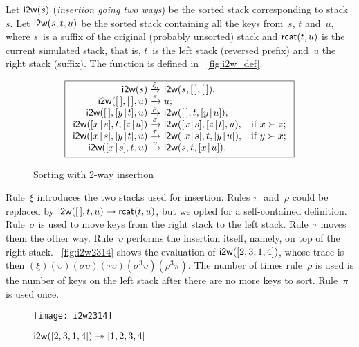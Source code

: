 Let \(\textsf{i2w}(s)\) (\emph{insertion going two
  ways}) be the sorted stack corresponding to stack~\(s\). Let
\(\textsf{i2w}(s,t,u)\) be the sorted stack
containing all the keys from~\(s\), \(t\) and~\(u\), where \(s\)~is a
suffix of the original (probably unsorted) stack and
\(\textsf{rcat}(t,u)\) is the current simulated
stack, that is, \(t\)~is the left stack (reversed prefix) and~\(u\)
the right stack (suffix). The function
 is defined in
\fig~\vref{fig:i2w_def}.
\begin{figure}
\begin{equation*}
\boxed{%
\begin{array}{r@{\;}l@{\;}ll}
\fun{i2w}(s)         & \xrightarrow{\smash{\xi}}
                     & \fun{i2w}(s,\el,\el).\\
\fun{i2w}(\el,\el,u) & \xrightarrow{\smash{\pi}}
                     & u;\\
\fun{i2w}(\el,\cons{y}{t},u)
                     & \xrightarrow{\smash{\rho}}
                     & \fun{i2w}(\el,t,\cons{y}{u});\\
\fun{i2w}(\cons{x}{s},t,\cons{z}{u})
                     & \xrightarrow{\smash{\sigma}}
                     & \fun{i2w}(\cons{x}{s},\cons{z}{t},u),
                     & \text{if \(x \succ z\)};\\
\fun{i2w}(\cons{x}{s},\cons{y}{t},u)
                     & \xrightarrow{\smash{\tau}}
                     & \fun{i2w}(\cons{x}{s},t,\cons{y}{u}),
                     & \text{if \(y \succ x\)};\\
\fun{i2w}(\cons{x}{s},t,u)
                     & \xrightarrow{\smash{\upsilon}}
                     & \fun{i2w}(s,t,\cons{x}{u}).
\end{array}}
\end{equation*}
\caption{Sorting with 2-way insertion 
\label{fig:i2w_def}}
\end{figure}
Rule~\(\xi\) introduces the two stacks used for insertion. Rules
\(\pi\)~and~\(\rho\) could be replaced by \(\textsf{i2w}([\,],t,u)
\rightarrow \textsf{rcat}(t,u)\), but we opted for a self\hyp{}contained
definition. Rule~\(\sigma\) is used to move keys from the right stack
to the left stack. Rule~\(\tau\) moves them the other
way. Rule~\(\upsilon\) performs the insertion itself, namely, on top
of the right stack. \Fig~\vref{fig:i2w2314} shows the evaluation of
\(\textsf{i2w}([2,3,1,4])\), whose trace  is then \((\xi)(\upsilon)(\sigma\upsilon)
(\tau\upsilon)(\sigma^3\upsilon)(\rho^3\pi)\). The number of times
rule~\(\rho\) is used is the number of keys on the left
stack after there are no more keys to sort. Rule~\(\pi\) is used once.
\begin{figure}[h]
\centering
\texttt{[image: i2w2314]}
\caption{\(\textsf{i2w}([2,3,1,4]) \twoheadrightarrow [1,2,3,4]\)
\label{fig:i2w2314}}
\end{figure}

